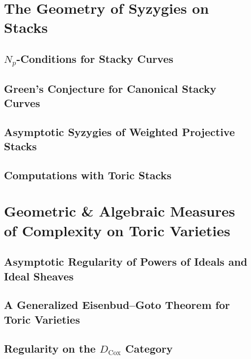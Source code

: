 \documentclass[11pt,reqno]{amsart}
\theoremstyle{remark}
\newcommand{\Cox}{\operatorname{Cox}}
\begin{document}
\section{The Geometry of Syzygies on Stacks}


\subsection{$N_{p}$-Conditions for Stacky Curves}

\subsection{Green's Conjecture for Canonical Stacky Curves} 

\subsection{Asymptotic Syzygies of Weighted Projective Stacks}

\subsection{Computations with Toric Stacks}

\section{Geometric \& Algebraic Measures of Complexity on Toric Varieties}

 \subsection{Asymptotic Regularity of Powers of Ideals and Ideal Sheaves}
 
 \subsection{A Generalized Eisenbud--Goto Theorem for Toric Varieties}
 
 \subsection{Regularity on the $D_{\Cox}$ Category}
 
\end{document}
